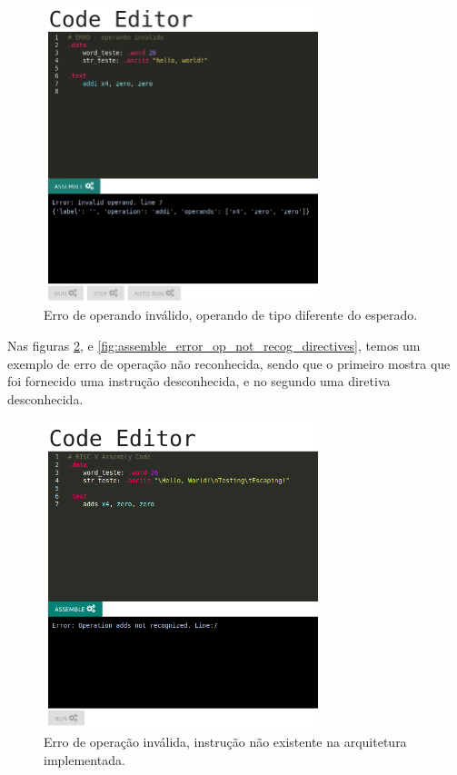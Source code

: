	\begin{figure}[h!]
	  \centering
	  \includegraphics[width=8cm]{img/assemble_error_operando_invalido.png}
	  \caption{Erro de operando inválido, operando de tipo diferente do esperado.}
	  \label{fig:assemble_error_operando_invalido}
	\end{figure}

	 Nas figuras \ref{fig:assemble_error_operation_not_recognized}, e \ref{fig:assemble_error_op_not_recog_directives}, temos um exemplo de erro de operação não reconhecida, sendo que o primeiro mostra que foi fornecido uma instrução desconhecida, e no segundo uma diretiva desconhecida.

	\begin{figure}[h!]
	  \centering
	  \includegraphics[width=8cm]{img/assemble_error_operation_not_recognized.png}
	  \caption{Erro de operação inválida, instrução não existente na arquitetura implementada.}
	  \label{fig:assemble_error_operation_not_recognized}
	\end{figure}

